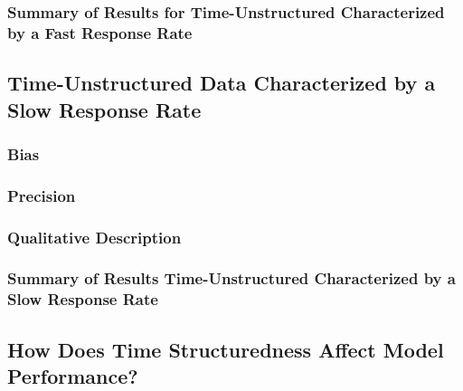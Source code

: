 \documentclass[
12pt, %
twoside,
english]{guelphthesis}
\begin{document}
\hypertarget{summary-of-results-for-time-unstructured-characterized-by-a-fast-response-rate}{%
\subsubsection{Summary of Results for Time-Unstructured Characterized by a Fast Response Rate}\label{summary-of-results-for-time-unstructured-characterized-by-a-fast-response-rate}}

\hypertarget{time-unstructured-data-characterized-by-a-slow-response-rate}{%
\subsection{Time-Unstructured Data Characterized by a Slow Response Rate}\label{time-unstructured-data-characterized-by-a-slow-response-rate}}

\hypertarget{bias-slow-exp3}{%
\subsubsection{Bias}\label{bias-slow-exp3}}

\hypertarget{precision-slow-exp3}{%
\subsubsection{Precision}\label{precision-slow-exp3}}

\hypertarget{qualitative-slow-exp3}{%
\subsubsection{Qualitative Description}\label{qualitative-slow-exp3}}

\hypertarget{summary-of-results-time-unstructured-characterized-by-a-slow-response-rate}{%
\subsubsection{Summary of Results Time-Unstructured Characterized by a Slow Response Rate}\label{summary-of-results-time-unstructured-characterized-by-a-slow-response-rate}}

\hypertarget{how-does-time-structuredness-affect-model-performance}{%
\subsection{How Does Time Structuredness Affect Model Performance?}\label{how-does-time-structuredness-affect-model-performance}}
\end{document}
